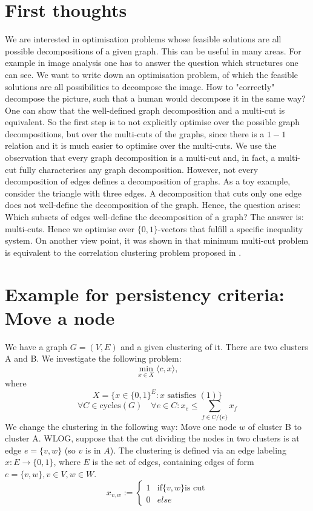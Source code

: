 \section{First thoughts}
We are interested in optimisation problems whose feasible solutions are all possible decompositions of a given graph. This can be useful in many areas. For example in image analysis one has to answer the question which structures one can see. We want to write down an optimisation problem, of which the feasible solutions are all possibilities to decompose the image. How to "correctly" decompose the picture, such that a human would decompose it in the same way? One can show that the well-defined graph decomposition and a multi-cut is equivalent. So the first step is to not explicitly optimise over the possible graph decompositions, but over the multi-cuts of the graphs, since there is a $1 - 1$ relation and it is much easier to optimise over the multi-cuts.  We use the observation that every graph decomposition is a multi-cut and, in fact, a multi-cut fully characterises any graph decomposition. However, not every decomposition of edges defines a decomposition of graphs. As a toy example, consider the triangle with three edges. A decomposition that cuts only one edge does not well-define the decomposition of the graph. Hence, the question arises: Which subsets of edges well-define the decomposition of a graph? The answer is: multi-cuts. Hence we optimise over $\{0,1\}$-vectors that fulfill a specific inequality system. On another view point, it was shown in \cite{Demaine} that minimum multi-cut problem is equivalent to the correlation clustering problem proposed in \cite{Bansal}. 




\section{Example for persistency criteria: Move a node}

We have a graph $G=(V,E)$ and a given clustering of it. There are two clusters A and B. We investigate the following problem: 
\[ \min_{x \in X} \langle c,x \rangle,  \] where 
\[ X = \{ x \in \{0,1\}^E: x \text{ satisfies } (1) \} \] 
\begin{equation}
\forall C \in \text{cycles}(G) \quad \forall e \in C: x_e \leq \sum_{f \in C / \{e\} } x_f
\end{equation}
We change the clustering in the following way: Move one node $w$ of cluster B to cluster A. WLOG, suppose that the cut dividing the nodes in two clusters is at edge $e=\{v,w\}$ (so $v$ is in $A$).
The clustering is defined via an edge labeling $x: E \rightarrow \{0,1\}$, where $E$ is the set of edges, containing edges of form $e=\{v,w\}, v \in V, w \in W$. 
\[ x_{v,w}:=  \begin{cases}
1 & \text{if} \{v,w\} \text{is cut} \\
0 & else \end{cases} \] 

